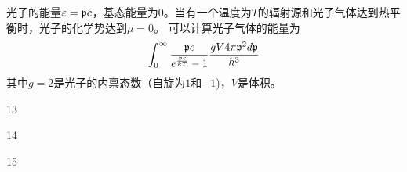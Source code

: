 \documentclass[CJK]{beamer}
\begin{document}
\begin{frame}
\bch
光子的能量$\varepsilon = {\mathfrak{p}} c$，基态能量为$0$。当有一个温度为$T$的辐射源和光子气体达到热平衡时，光子的化学势达到$\mu = 0$。
可以计算光子气体的能量为
$$\int_0^\infty \frac{{\mathfrak{p}} c}{e^{\frac{{\mathfrak{p}} c}{kT}}-1} \frac{g V 4\pi{\mathfrak{p}}^2 d{\mathfrak{p}}}{h^3} $$
其中$g=2$是光子的内禀态数（自旋为$1$和$-1$)，$V$是体积。

\ech
\end{frame}


\begin{frame}
\bch
\bitem
\item[13]{}
\item[14]{}
\item[15]{}
\eitem
\ech
\end{frame}
\end{document}
